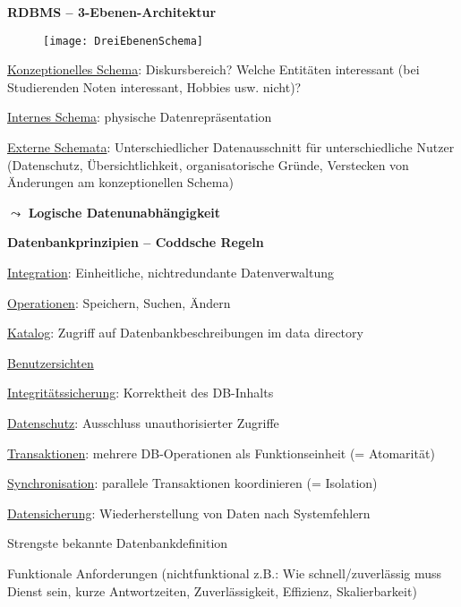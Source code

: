 \textbf{RDBMS -- 3-Ebenen-Architektur}
\begin{figure}[H]\centering\label{DreiEbenenSchema}\texttt{[image: DreiEbenenSchema]}\end{figure}
\begin{items}
  \item \underline{Konzeptionelles Schema}: Diskursbereich? Welche Entitäten interessant (bei Studierenden Noten interessant, Hobbies usw. nicht)?
  \item \underline{Internes Schema}: physische Datenrepräsentation
  \item \underline{Externe Schemata}: Unterschiedlicher Datenausschnitt für unterschiedliche Nutzer (Datenschutz, Übersichtlichkeit, organisatorische Gründe, Verstecken von Änderungen am konzeptionellen Schema)
  \item \( \leadsto \) \textbf{Logische Datenunabhängigkeit}
\end{items}

\newpage

\textbf{Datenbankprinzipien -- Coddsche Regeln}
\begin{enumeration}
  \item \underline{Integration}: Einheitliche, nichtredundante Datenverwaltung
  \item \underline{Operationen}: Speichern, Suchen, Ändern
  \item \underline{Katalog}: Zugriff auf Datenbankbeschreibungen im data directory
  \item \underline{Benutzersichten}
  \item \underline{Integritätssicherung}: Korrektheit des DB-Inhalts
  \item \underline{Datenschutz}: Ausschluss unauthorisierter Zugriffe
  \item \underline{Transaktionen}: mehrere DB-Operationen als Funktionseinheit (= Atomarität)
  \item \underline{Synchronisation}: parallele Transaktionen koordinieren (= Isolation)
  \item \underline{Datensicherung}: Wiederherstellung von Daten nach Systemfehlern
\end{enumeration}
\begin{items}
  \item Strengste bekannte Datenbankdefinition
  \item Funktionale Anforderungen (nichtfunktional z.B.: Wie schnell/zuverlässig muss Dienst sein, kurze Antwortzeiten, Zuverlässigkeit, Effizienz, Skalierbarkeit)
\end{items}

